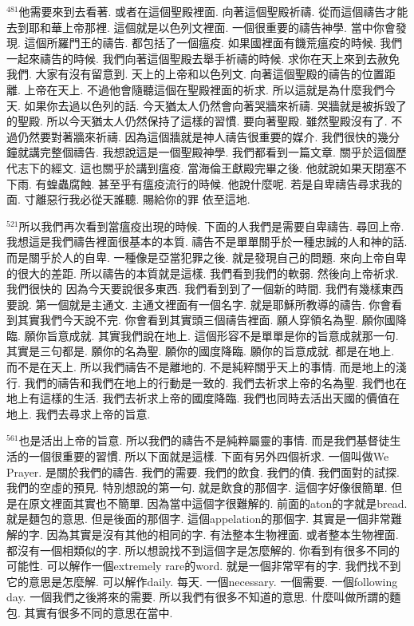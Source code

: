 \documentclass{book}
\begin{document}
$^{481}$他需要來到去看著.
或者在這個聖殿裡面.
向著這個聖殿祈禱.
從而這個禱告才能去到耶和華上帝那裡.
這個就是以色列文裡面.
一個很重要的禱告神學.
當中你會發現.
這個所羅門王的禱告.
都包括了一個瘟疫.
如果國裡面有饑荒瘟疫的時候.
我們一起來禱告的時候.
我們向著這個聖殿去舉手祈禱的時候.
求你在天上來到去赦免我們.
大家有沒有留意到.
天上的上帝和以色列文.
向著這個聖殿的禱告的位置距離.
上帝在天上.
不過他會隨聽這個在聖殿裡面的祈求.
所以這就是為什麼我們今天.
如果你去過以色列的話.
今天猶太人仍然會向著哭牆來祈禱.
哭牆就是被拆毀了的聖殿.
所以今天猶太人仍然保持了這樣的習慣.
要向著聖殿.
雖然聖殿沒有了.
不過仍然要對著牆來祈禱.
因為這個牆就是神人禱告很重要的媒介.
我們很快的幾分鐘就講完整個禱告.
我想說這是一個聖殿神學.
我們都看到一篇文章.
關乎於這個歷代志下的經文.
這也關乎於講到瘟疫.
當海倫王獻殿完畢之後.
他就說如果天閉塞不下雨.
有蝗蟲腐蝕.
甚至乎有瘟疫流行的時候.
他說什麼呢.
若是自卑禱告尋求我的面.
寸離惡行我必從天誰聽.
賜給你的罪 依至這地.

$^{521}$所以我們再次看到當瘟疫出現的時候.
下面的人我們是需要自卑禱告.
尋回上帝.
我想這是我們禱告裡面很基本的本質.
禱告不是單單關乎於一種忠誠的人和神的話.
而是關乎於人的自卑.
一種像是亞當犯罪之後.
就是發現自己的問題.
來向上帝自卑的很大的差距.
所以禱告的本質就是這樣.
我們看到我們的軟弱.
然後向上帝祈求.
我們很快的 因為今天要說很多東西.
我們看到到了一個新的時間.
我們有幾樣東西要說.
第一個就是主通文.
主通文裡面有一個名字.
就是耶穌所教導的禱告.
你會看到其實我們今天說不完.
你會看到其實頭三個禱告裡面.
願人穿領名為聖.
願你國降臨.
願你旨意成就.
其實我們說在地上.
這個形容不是單單是你的旨意成就那一句.
其實是三句都是.
願你的名為聖.
願你的國度降臨.
願你的旨意成就.
都是在地上.
而不是在天上.
所以我們禱告不是離地的.
不是純粹關乎天上的事情.
而是地上的淺行.
我們的禱告和我們在地上的行動是一致的.
我們去祈求上帝的名為聖.
我們也在地上有這樣的生活.
我們去祈求上帝的國度降臨.
我們也同時去活出天國的價值在地上.
我們去尋求上帝的旨意.

$^{561}$也是活出上帝的旨意.
所以我們的禱告不是純粹屬靈的事情.
而是我們基督徒生活的一個很重要的習慣.
所以下面就是這樣.
下面有另外四個祈求.
一個叫做We Prayer.
是關於我們的禱告.
我們的需要.
我們的飲食.
我們的債.
我們面對的試探.
我們的空虛的預見.
特別想說的第一句.
就是飲食的那個字.
這個字好像很簡單.
但是在原文裡面其實也不簡單.
因為當中這個字很難解的.
前面的aton的字就是bread.
就是麵包的意思.
但是後面的那個字.
這個appelation的那個字.
其實是一個非常難解的字.
因為其實是沒有其他的相同的字.
有法整本生物裡面.
或者整本生物裡面.
都沒有一個相類似的字.
所以想說找不到這個字是怎麼解的.
你看到有很多不同的可能性.
可以解作一個extremely rare的word.
就是一個非常罕有的字.
我們找不到它的意思是怎麼解.
可以解作daily.
每天.
一個necessary.
一個需要.
一個following day.
一個我們之後將來的需要.
所以我們有很多不知道的意思.
什麼叫做所謂的麵包.
其實有很多不同的意思在當中.
\end{document}
